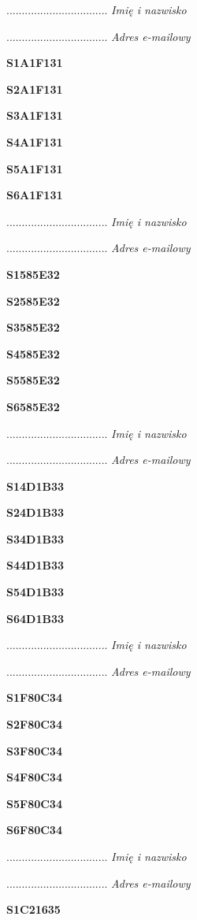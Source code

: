 .................................
\textit{Imię i nazwisko}

.................................
\textit{Adres e-mailowy}

\Large \textbf{S1A1F131}

\Large \textbf{S2A1F131}

\Large \textbf{S3A1F131}

\Large \textbf{S4A1F131}

\Large \textbf{S5A1F131}

\Large \textbf{S6A1F131}

.................................
\textit{Imię i nazwisko}

.................................
\textit{Adres e-mailowy}

\Large \textbf{S1585E32}

\Large \textbf{S2585E32}

\Large \textbf{S3585E32}

\Large \textbf{S4585E32}

\Large \textbf{S5585E32}

\Large \textbf{S6585E32}

.................................
\textit{Imię i nazwisko}

.................................
\textit{Adres e-mailowy}

\Large \textbf{S14D1B33}

\Large \textbf{S24D1B33}

\Large \textbf{S34D1B33}

\Large \textbf{S44D1B33}

\Large \textbf{S54D1B33}

\Large \textbf{S64D1B33}

.................................
\textit{Imię i nazwisko}

.................................
\textit{Adres e-mailowy}

\Large \textbf{S1F80C34}

\Large \textbf{S2F80C34}

\Large \textbf{S3F80C34}

\Large \textbf{S4F80C34}

\Large \textbf{S5F80C34}

\Large \textbf{S6F80C34}

.................................
\textit{Imię i nazwisko}

.................................
\textit{Adres e-mailowy}

\Large \textbf{S1C21635}

